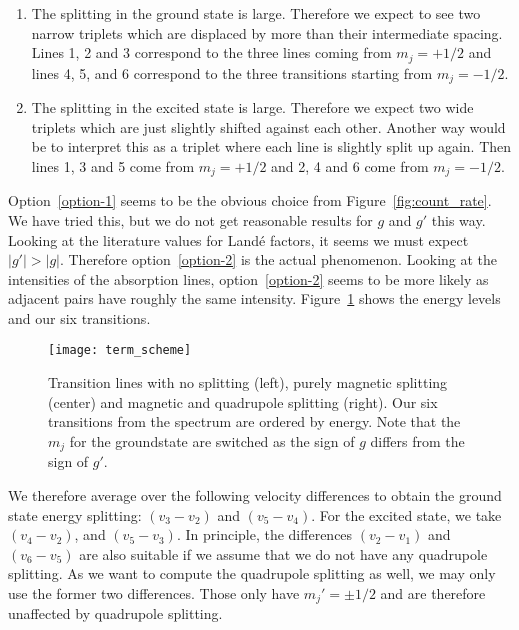 \documentclass[11pt, english, fleqn, DIV=15, headinclude, BCOR=2cm]{scrreprt}
\begin{document}
\begin{enumerate}
    \item
        \label{option-1}

        The splitting in the ground state is large. Therefore we expect to see
        two narrow triplets which are displaced by more than their intermediate
        spacing. Lines 1, 2 and 3 correspond to the three lines coming from
        $m_j = +1/2$ and lines 4, 5, and 6 correspond to the three transitions
        starting from $m_j = -1/2$.

    \item
        \label{option-2}

        The splitting in the excited state is large. Therefore we expect two
        wide triplets which are just slightly shifted against each other.
        Another way would be to interpret this as a triplet where each line is
        slightly split up again. Then lines 1, 3 and 5 come from $m_j = +1/2$
        and 2, 4 and 6 come from $m_j = -1/2$.
\end{enumerate}

Option~\ref{option-1} seems to be the obvious choice from
Figure~\ref{fig:count_rate}. We have tried this, but we do not get reasonable
results for $g$ and $g'$ this way. Looking at the literature values for Landé
factors, it seems we must expect $|g'| > |g|$. Therefore option~\ref{option-2}
is the actual phenomenon. Looking at the intensities of the absorption lines,
option~\ref{option-2} seems to be more likely as adjacent pairs have roughly
the same intensity. Figure~\ref{fig:term_scheme} shows the energy levels and
our six transitions.

\begin{figure}
    \centering
    \texttt{[image: term\_scheme]}
    \caption{%
        Transition lines with no splitting (left), purely magnetic splitting
        (center) and magnetic and quadrupole splitting (right). Our six
        transitions from the spectrum are ordered by energy. Note that the
        $m_j$ for the groundstate are switched as the sign of $g$ differs from
        the sign of $g'$.
    }
    \label{fig:term_scheme}
\end{figure}

We therefore average over the following velocity differences to obtain the
ground state energy splitting: $(v_3-v_2)$ and $(v_5-v_4)$. For the excited
state, we take $(v_4-v_2)$, and $(v_5-v_3)$. In principle, the differences
$(v_2-v_1)$ and $(v_6-v_5)$ are also suitable if we assume that we do not have
any quadrupole splitting. As we want to compute the quadrupole splitting as
well, we may only use the former two differences. Those only have $m_j' = \pm
1/2$ and are therefore unaffected by quadrupole splitting.
\end{document}
